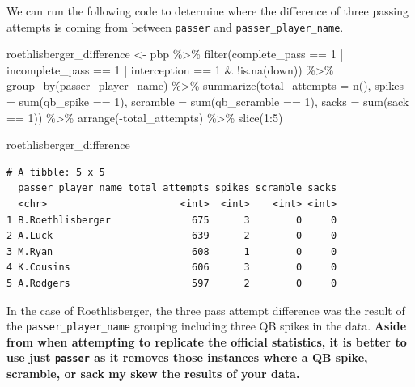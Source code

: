 \documentclass[
  letterpaper,
]{krantz}
\newenvironment{Shaded}{\begin{snugshade}}{\end{snugshade}}
\newcommand{\AttributeTok}[1]{\textcolor[rgb]{0.40,0.45,0.13}{#1}}
\newcommand{\DecValTok}[1]{\textcolor[rgb]{0.68,0.00,0.00}{#1}}
\newcommand{\FunctionTok}[1]{\textcolor[rgb]{0.28,0.35,0.67}{#1}}
\newcommand{\NormalTok}[1]{\textcolor[rgb]{0.00,0.23,0.31}{#1}}
\newcommand{\OtherTok}[1]{\textcolor[rgb]{0.00,0.23,0.31}{#1}}
\newcommand{\SpecialCharTok}[1]{\textcolor[rgb]{0.37,0.37,0.37}{#1}}
\begin{document}
\begin{tcolorbox}
We can run the following code to determine where the difference of three
passing attempts is coming from between \texttt{passer} and
\texttt{passer\_player\_name}.

\begin{Shaded}
\begin{Highlighting}[]
\NormalTok{roethlisberger\_difference }\OtherTok{\textless{}{-}}\NormalTok{ pbp }\SpecialCharTok{\%\textgreater{}\%}
  \FunctionTok{filter}\NormalTok{(complete\_pass }\SpecialCharTok{==} \DecValTok{1} \SpecialCharTok{|}
\NormalTok{           incomplete\_pass }\SpecialCharTok{==} \DecValTok{1} \SpecialCharTok{|}
\NormalTok{           interception }\SpecialCharTok{==} \DecValTok{1} \SpecialCharTok{\&} \SpecialCharTok{!}\FunctionTok{is.na}\NormalTok{(down)) }\SpecialCharTok{\%\textgreater{}\%}
  \FunctionTok{group\_by}\NormalTok{(passer\_player\_name) }\SpecialCharTok{\%\textgreater{}\%}
  \FunctionTok{summarize}\NormalTok{(}\AttributeTok{total\_attempts =} \FunctionTok{n}\NormalTok{(),}
            \AttributeTok{spikes =} \FunctionTok{sum}\NormalTok{(qb\_spike }\SpecialCharTok{==} \DecValTok{1}\NormalTok{),}
            \AttributeTok{scramble =} \FunctionTok{sum}\NormalTok{(qb\_scramble }\SpecialCharTok{==} \DecValTok{1}\NormalTok{),}
            \AttributeTok{sacks =} \FunctionTok{sum}\NormalTok{(sack }\SpecialCharTok{==} \DecValTok{1}\NormalTok{)) }\SpecialCharTok{\%\textgreater{}\%}
  \FunctionTok{arrange}\NormalTok{(}\SpecialCharTok{{-}}\NormalTok{total\_attempts) }\SpecialCharTok{\%\textgreater{}\%}
  \FunctionTok{slice}\NormalTok{(}\DecValTok{1}\SpecialCharTok{:}\DecValTok{5}\NormalTok{)}

\NormalTok{roethlisberger\_difference}
\end{Highlighting}
\end{Shaded}

\begin{verbatim}
# A tibble: 5 x 5
  passer_player_name total_attempts spikes scramble sacks
  <chr>                       <int>  <int>    <int> <int>
1 B.Roethlisberger              675      3        0     0
2 A.Luck                        639      2        0     0
3 M.Ryan                        608      1        0     0
4 K.Cousins                     606      3        0     0
5 A.Rodgers                     597      2        0     0
\end{verbatim}

In the case of Roethlisberger, the three pass attempt difference was the
result of the \texttt{passer\_player\_name} grouping including three QB
spikes in the data. \textbf{Aside from when attempting to replicate the
official statistics, it is better to use just \texttt{passer} as it
removes those instances where a QB spike, scramble, or sack my skew the
results of your data.}

\end{tcolorbox}
\end{document}
